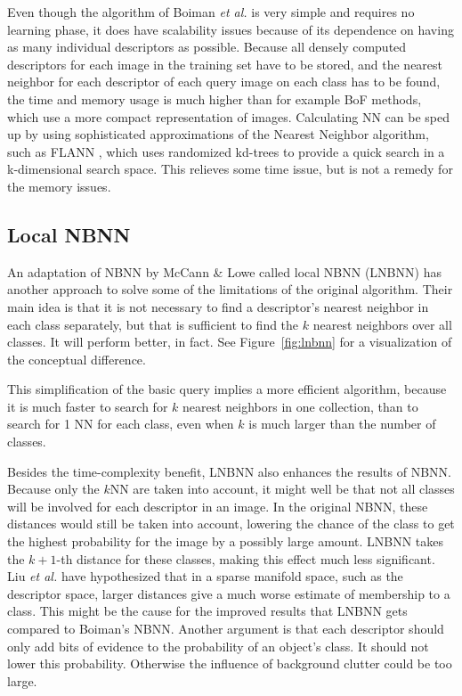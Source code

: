 Even though the algorithm of Boiman \emph{et al.} \cite{boiman2008defense} is very simple and requires no learning phase, it does have scalability issues because of its dependence on having as many individual descriptors as possible. Because all densely computed descriptors for each image in the training set have to be stored, and the nearest neighbor for each descriptor of each query image on each class has to be found, the time and memory usage is much higher than for example BoF methods, which use a more compact representation of images. Calculating NN can be sped up by using sophisticated approximations of the Nearest Neighbor algorithm, such as FLANN \cite{muja2009fast}, which uses randomized kd-trees to provide a quick search in a k-dimensional search space. This relieves some time issue, but is not a remedy for the memory issues.


\subsection{Local NBNN} %
\label{sec:local_nbnn}

An adaptation of NBNN by McCann \& Lowe called local NBNN (LNBNN) \cite{mccann2012local} has another approach to solve some of the limitations of the original algorithm. Their main idea is that it is not necessary to find a descriptor's nearest neighbor in each class separately, but that is sufficient to find the $k$ nearest neighbors over all classes. It will perform better, in fact. See Figure~\ref{fig:lnbnn} for a visualization of the conceptual difference.

This simplification of the basic query implies a more efficient algorithm, because it is much faster to search for $k$ nearest neighbors in one collection, than to search for 1 NN for each class, even when $k$ is much larger than the number of classes.

Besides the time-complexity benefit, LNBNN also enhances the results of NBNN. Because only the $k$NN are taken into account, it might well be that not all classes will be involved for each descriptor in an image. In the original NBNN, these distances would still be taken into account, lowering the chance of the class to get the highest probability for the image by a possibly large amount. LNBNN takes the $k+1$-th distance for these classes, making this effect much less significant. Liu \emph{et al.} \cite{liu2011defense} have hypothesized that in a sparse manifold space, such as the descriptor space, larger distances give a much worse estimate of membership to a class. This might be the cause for the improved results that LNBNN gets compared to Boiman's NBNN. Another argument is that each descriptor should only add bits of evidence to the probability of an object's class. It should not lower this probability. Otherwise the influence of background clutter could be too large.

